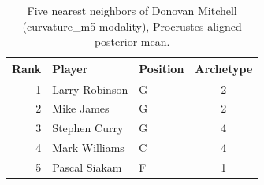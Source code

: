 \begin{table}[htbp]
  \centering\small
  \begin{tabular}{rllc}
    \toprule
    Rank & Player & Position & Archetype \\
    \midrule
    1 & Larry Robinson & G & 2 \\
    2 & Mike James & G & 2 \\
    3 & Stephen Curry & G & 4 \\
    4 & Mark Williams & C & 4 \\
    5 & Pascal Siakam & F & 1 \\
    \bottomrule
  \end{tabular}
  \caption{Five nearest neighbors of Donovan Mitchell (curvature_m5 modality), Procrustes-aligned posterior mean.}
  \label{tab:Donovan_Mitchell_neighbors_curvature_m5}
\end{table}

